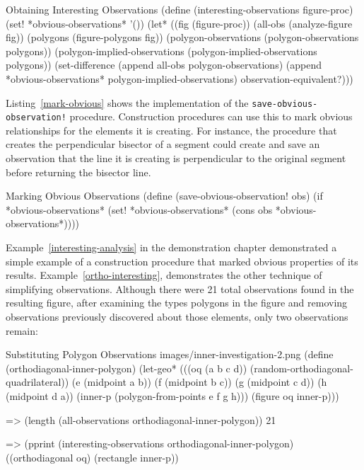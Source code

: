 \newpage

\begin{code-listing}
[label=interesting-obs-impl]
{Obtaining Interesting Observations}
(define (interesting-observations figure-proc)
  (set! *obvious-observations* '())
  (let* ((fig (figure-proc))
         (all-obs (analyze-figure fig))
         (polygons (figure-polygons fig))
         (polygon-observations (polygon-observations polygons))
         (polygon-implied-observations
           (polygon-implied-observations polygons))
    (set-difference (append all-obs polygon-observations)
                    (append *obvious-observations* polygon-implied-observations)
                    observation-equivalent?)))
\end{code-listing}

Listing~\ref{mark-obvious} shows the implementation of the
\texttt{save-obvious-observation!} procedure. Construction procedures
can use this to mark obvious relationships for the elements it is
creating. For instance, the procedure that creates the perpendicular
bisector of a segment could create and save an observation that the
line it is creating is perpendicular to the original segment before
returning the bisector line.

\begin{code-listing}
[label=mark-obvious]
{Marking Obvious Observations}
(define (save-obvious-observation! obs)
  (if *obvious-observations*
      (set! *obvious-observations*
            (cons obs *obvious-observations*))))
\end{code-listing}

Example~\ref{interesting-analysis} in the demonstration chapter
demonstrated a simple example of a construction procedure that marked
obvious properties of its results. Example~\ref{ortho-interesting},
demonstrates the other technique of simplifying observations. Although
there were 21 total observations found in the resulting figure, after
examining the types polygons in the figure and removing observations
previously discovered about those elements, only two observations
remain:

\begin{img-example}
[label=ortho-interesting]
{Substituting Polygon Observations}
{images/inner-investigation-2.png}
(define (orthodiagonal-inner-polygon)
  (let-geo*
      (((oq (a b c d)) (random-orthodiagonal-quadrilateral))
       (e (midpoint a b))
       (f (midpoint b c))
       (g (midpoint c d))
       (h (midpoint d a))
       (inner-p (polygon-from-points e f g h)))
    (figure oq inner-p)))

=> (length (all-observations orthodiagonal-inner-polygon))
21

=> (pprint (interesting-observations orthodiagonal-inner-polygon)
((orthodiagonal oq) (rectangle inner-p))
\end{img-example}

